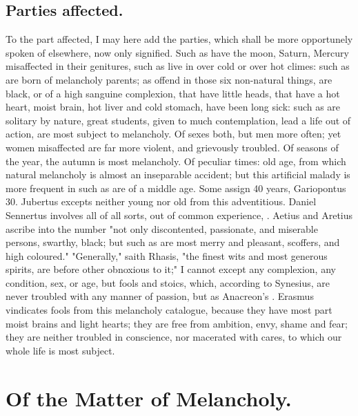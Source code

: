 \subsection{Parties affected.}
To the part affected, I may here add the parties, which shall be more
opportunely spoken of elsewhere, now only signified. Such as have the moon,
Saturn, Mercury misaffected in their genitures, such as live in over cold or
over hot climes: such as are born of melancholy parents; as offend in those six
non-natural things, are black, or of a high sanguine complexion,
that have little heads, that have a hot heart, moist
brain, hot liver and cold stomach, have been long sick: such as are solitary by
nature, great students, given to much contemplation, lead a life out of action,
are most subject to melancholy. Of sexes both, but men more often; yet
women misaffected are far more violent, and grievously
troubled. Of seasons of the year, the autumn is most melancholy. Of peculiar
times: old age, from which natural melancholy is almost an inseparable
accident; but this artificial malady is more frequent in such as are of a
middle age. Some assign 40 years, Gariopontus 30. Jubertus
excepts neither young nor old from this adventitious. Daniel Sennertus involves
all of all sorts, out of common experience, . Aetius and Aretius
ascribe into the number "not only
discontented, passionate, and miserable persons, swarthy,
black; but such as are most merry and pleasant, scoffers, and high coloured."
"Generally," saith Rhasis, "the finest wits and most
generous spirits, are before other obnoxious to it;" I cannot except any
complexion, any condition, sex, or age, but fools and
stoics, which, according to Synesius, are never troubled
with any manner of passion, but as Anacreon's . Erasmus vindicates fools from this melancholy
catalogue, because they have most part moist brains and light hearts;
they are free from ambition, envy, shame and fear; they
are neither troubled in conscience, nor macerated with cares, to which our
whole life is most subject.

\section{Of the Matter of Melancholy.}\label{sec:matter-of-melancholy}

